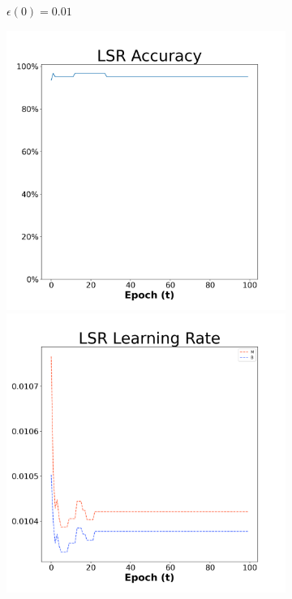 \begin{figure}[H]
\begin{subfigure}{0.3\textwidth}
  \caption{$\epsilon(0)=0.01$}
\end{subfigure}\hfil %
\begin{subfigure}{0.3\textwidth}
  \includegraphics[width=\linewidth]{images/exper1/breast/LSR_0.03_acc.png}
  \includegraphics[width=\linewidth]{images/exper1/breast/LSR_0.03_lr.png}

\end{subfigure}
\end{figure}
